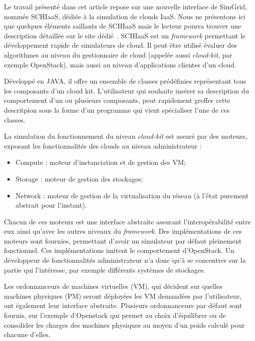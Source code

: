 \documentclass[parallelisme]{compas2017}
\begin{document}
Le  travail présenté  dans  cet article  repose sur  une  nouvelle interface  de
SimGrid,  nommée SCHIaaS,  dédiée  à  la simulation  de  clouds  IaaS.  Nous  ne
présentons ici que quelques éléments saillants de SCHIaaS mais le lecteur pourra
trouver  une  description  détaillée  sur  le  site  dédié~\cite{schiaas-gforge}.
SCHIaaS  est  un  \textit{framework}   permettant  le  développement  rapide  de
simulateurs de cloud. Il peut être utilisé évaluer des algorithmes au niveau du 
gestionnaire de cloud (appelée aussi \textit{cloud-kit},  par exemple
OpenStack), mais aussi au niveau d'applications clientes d'un cloud.

Développé en JAVA, il offre un ensemble de classes prédéfinies représentant tous
les composants d'un cloud kit. L'utilisateur qui souhaite insérer sa description
du  comportement d'un  ou plusieurs  composants, peut  rapidement greffer  cette
descritpion sous  la forme  d'un programme  qui vient  spécialiser l'une  de ces
classes.  

La simulation du fonctionnement du  niveau \textit{cloud-kit} est assuré par des
moteurs, exposant les fonctionnalités des clouds au niveau administrateur :
\begin{itemize}
 \item Compute : moteur d'instanciation et de gestion des VM;
 \item Storage : moteur de gestion des stockages;
 \item Network : moteur de gestion de la virtualisation du réseau (à l'état purement abstrait pour l'instant).
\end{itemize}

Chacun de  ces moteurs est  une interface abstraite  assurant l'interopérabilité
entre  eux  ainsi  qu'avec  les   autres  niveaux  du  \textit{framework}.   Des
implémentations de ces  moteurs sont fournies, permettant  d'avoir un simulateur
par défaut pleinement fonctionnel.   Ces implémentations imitent le comportement
d'OpenStack. Un développeur  de fonctionnalités administrateur n'a  donc qu'à se
concentrer sur  la partie  qui l'intéresse, par  exemple différents  systèmes de
stockages.

Les ordonnanceurs de machines virtuelles (VM), qui décident sur quelles machines
physiques  (PM)  seront  déployées  les  VM  demandées  par  l'utilisateur,  ont
également  leur interface  abstraite.  Plusieurs ordonnanceurs  par défaut  sont
fournis,  sur l'exemple  d'Openstack  qui  permet au  choix  d'équilibrer ou  de
consolider les charges  des machines physiques au moyen d'un  poids calculé pour
chacune d'elles.
\end{document}
